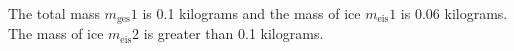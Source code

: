 The total mass \( m_{\text{ges}} 1 \) is 0.1 kilograms and the mass of ice \( m_{\text{eis}} 1 \) is 0.06 kilograms. The mass of ice \( m_{\text{eis}} 2 \) is greater than 0.1 kilograms.